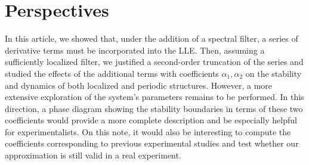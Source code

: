 

\section{Perspectives}

In this article, we showed that, under the addition of a spectral filter, a series of
derivative terms must be incorporated into the LLE. Then, assuming a sufficiently
localized filter, we justified a second-order truncation of the series and studied 
the effects of the additional terms with coefficients $\alpha_1, \alpha_2$ on the stability and dynamics of both localized 
and periodic structures. However, a more extensive exploration of the system's parameters 
remains to be performed. In this direction, a phase diagram showing the stability boundaries
in terms of these two coefficients would provide a more complete description and be
especially helpful for experimentalists. On this note, it would also be interesting to
compute the coefficients corresponding to previous experimental studies \cite{bessin2019gain}
and test whether our approximation is still valid in a real experiment.
